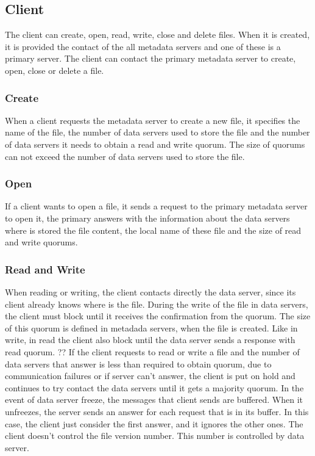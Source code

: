 \subsection{Client}

The client can create, open, read, write, close and delete files. When
it is created, it is provided the contact of the all metadata servers
and one of these is a primary server. 
The client can contact the primary metadata server to create, open,
close or delete a file.

\subsubsection{Create} 

When a client requests the metadata server to create a new file, it
specifies the name of the file, the number of data servers used to
store the file and the number of data servers it needs to obtain a read
and write quorum. The size of quorums can not exceed the number of data
servers used to store the file. 

\subsubsection{Open}

If a client wants to open a file, it sends a request to the primary
metadata server to open it, the primary answers with the information
about the data servers where is stored the file content, the local name
of these file and the size of read and write quorums.

\subsubsection{Read and Write}

When reading or writing, the client contacts directly the data server,
since its client already knows where is the file. During the write of
the file in data servers, the client must block until it receives the
confirmation from the quorum. The size of this quorum is defined in
metadada servers, when the file is created. Like in write, in read the
client also block until the data server sends a response with read quorum. ??
If the client requests to read or write a file and the number of data
servers that answer is less than required to obtain quorum, due to
communication failures or if server can't answer, the client is put on
hold and continues to try contact the data servers until it gets a
majority quorum.
In the event of data server freeze, the messages that client sends are
buffered. When it unfreezes, the server sends an answer for each request
that is in its buffer. In this case, the client just consider the first
answer, and it ignores the other ones.
The client doesn't control the file version number. This number is
controlled by data server.

